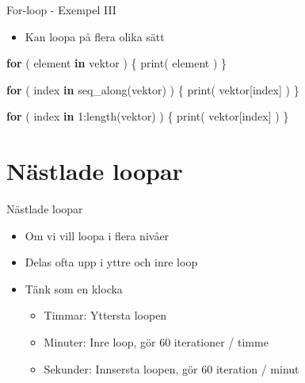 \documentclass[
  11pt,
  ignorenonframetext,
]{beamer}
\newenvironment{Shaded}{\begin{snugshade}}{\end{snugshade}}
\newcommand{\ControlFlowTok}[1]{\textcolor[rgb]{0.13,0.29,0.53}{\textbf{#1}}}
\newcommand{\DecValTok}[1]{\textcolor[rgb]{0.00,0.00,0.81}{#1}}
\newcommand{\FunctionTok}[1]{\textcolor[rgb]{0.00,0.00,0.00}{#1}}
\newcommand{\NormalTok}[1]{#1}
\newcommand{\SpecialCharTok}[1]{\textcolor[rgb]{0.00,0.00,0.00}{#1}}
\providecommand{\tightlist}{%
  \setlength{\itemsep}{0pt}\setlength{\parskip}{0pt}}
\begin{document}
\begin{frame}[fragile]{For-loop - Exempel III}
\protect\hypertarget{for-loop---exempel-iii}{}
\begin{itemize}
\tightlist
\item
  Kan loopa på flera olika sätt
\end{itemize}

\begin{Shaded}
\begin{Highlighting}[]
\ControlFlowTok{for}\NormalTok{ ( element }\ControlFlowTok{in}\NormalTok{ vektor ) \{}
  \FunctionTok{print}\NormalTok{( element )}
\NormalTok{\}}
\end{Highlighting}
\end{Shaded}

\begin{Shaded}
\begin{Highlighting}[]
\ControlFlowTok{for}\NormalTok{ ( index }\ControlFlowTok{in} \FunctionTok{seq\_along}\NormalTok{(vektor) ) \{}
  \FunctionTok{print}\NormalTok{( vektor[index] )}
\NormalTok{\}}
\end{Highlighting}
\end{Shaded}

\begin{Shaded}
\begin{Highlighting}[]
\ControlFlowTok{for}\NormalTok{ ( index }\ControlFlowTok{in} \DecValTok{1}\SpecialCharTok{:}\FunctionTok{length}\NormalTok{(vektor) ) \{}
  \FunctionTok{print}\NormalTok{( vektor[index] )}
\NormalTok{\}}
\end{Highlighting}
\end{Shaded}
\end{frame}

\hypertarget{nuxe4stlade-loopar}{%
\section{Nästlade loopar}\label{nuxe4stlade-loopar}}

\begin{frame}{Nästlade loopar}
\protect\hypertarget{nuxe4stlade-loopar-1}{}
\begin{itemize}
\tightlist
\item
  Om vi vill loopa i flera nivåer
\item
  Delas ofta upp i yttre och inre loop
\item
  Tänk som en klocka

  \begin{itemize}
  \tightlist
  \item
    Timmar: Yttersta loopen
  \item
    Minuter: Inre loop, gör 60 iterationer / timme
  \item
    Sekunder: Innsersta loopen, gör 60 iteration / minut
  \end{itemize}
\end{itemize}
\end{frame}
\end{document}
